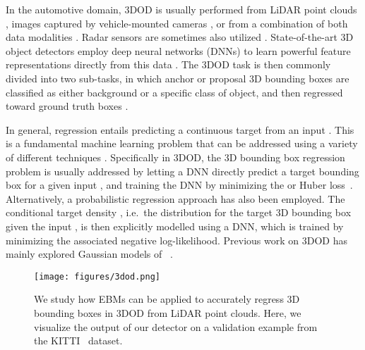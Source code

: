 \documentclass[letterpaper, 10 pt, conference]{ieeeconf}
\begin{document}
In the automotive domain, 3DOD is usually performed from LiDAR point clouds \cite{yang2019std, shi2020points, shi2020pv}, images captured by vehicle-mounted cameras \cite{simonelli2019disentangling, chen2020monopair, shi2020distance}, or from a combination of both data modalities \cite{liang2019multi, liang2018deep, ku2018joint}. Radar sensors are sometimes also utilized \cite{meyer2019automotive, meyer2019deep, yang2020radarnet}. State-of-the-art 3D object detectors employ deep neural networks (DNNs) to learn powerful feature representations directly from this data \cite{shi2020pv, pang2020CLOCs, yoo20203d}. The 3DOD task is then commonly divided into two sub-tasks, in which anchor or proposal 3D bounding boxes are classified as either background or a specific class of object, and then regressed toward ground truth boxes \cite{zhou2018voxelnet, lang2019pointpillars, shi2019pointrcnn}.

In general, regression entails predicting a continuous target  from an input . This is a fundamental machine learning problem that can be addressed using a variety of different techniques \cite{lathuiliere2019comprehensive, gast2018lightweight, makansi2019overcoming, pan2018mean, Diaz_2019_CVPR}. Specifically in 3DOD, the 3D bounding box regression problem is usually addressed by letting a DNN directly predict a target bounding box  for a given input , and training the DNN by minimizing the  or Huber loss~\cite{huber1964robust, zhou2018voxelnet, yang2019std, shi2020pv, he2020structure}. Alternatively, a probabilistic regression approach has also been employed. The conditional target density , i.e.\ the distribution for the target 3D bounding box  given the input , is then explicitly modelled using a DNN, which is trained by minimizing the associated negative log-likelihood. Previous work on 3DOD has mainly explored Gaussian models of ~\cite{feng2018towards, feng2019leveraging, feng2019can, meyer2019lasernet}. 

\begin{figure}[t]
    \centering
    \texttt{[image: figures/3dod.png]}\vspace{-2.0mm}
    \caption{We study how EBMs can be applied to accurately regress 3D bounding boxes in 3DOD from LiDAR point clouds. Here, we visualize the output of our detector on a validation example from the KITTI~\cite{geiger2012we} dataset.}\vspace{-3mm}
    \label{fig:3dod}
\end{figure}
\end{document}
